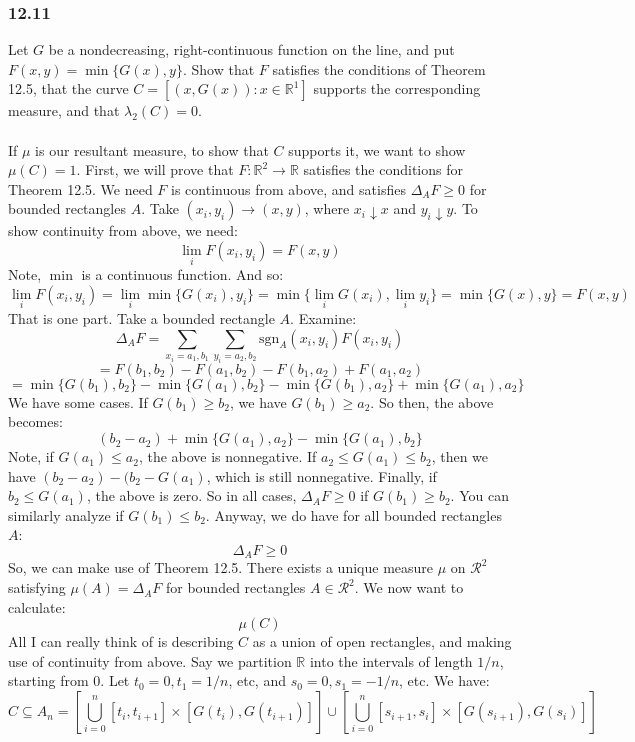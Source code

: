 \documentclass[12pt,a4paper]{article}
\newcommand{\1}[1]{\mathbbm{1}\left\{ #1 \right\}}
\newcommand{\R}{\mathbb{R}}
\newcommand{\rcal}{\mathcal{R}}
\newcommand{\sgn}{\text{sgn}}
\begin{document}
\subsubsection{12.11} Let $G$ be a nondecreasing, right-continuous function on the line, and put $F(x,y) = \min\{G(x),y\}$. Show that $F$ satisfies the conditions of Theorem 12.5, that the curve $C = \left[(x,G(x)) : x \in \R^1\right]$ supports the corresponding measure, and that $\lambda_2(C) = 0$.
\\\\
If $\mu$ is our resultant measure, to show that $C$ supports it, we want to show $\mu(C) = 1$. First, we will prove that $F: \R^2 \to \R$ satisfies the conditions for Theorem 12.5. We need $F$ is continuous from above, and satisfies $\Delta_AF \geq 0$ for bounded rectangles $A$. Take $(x_i,y_i) \to (x,y)$, where $x_i \downarrow x$ and $y_i \downarrow y$. To show continuity from above, we need:
$$
	\lim_i F(x_i,y_i) = F(x,y)
$$
Note, $\min$ is a continuous function. And so:
$$
	\lim_i F(x_i,y_i) = \lim_i \min\{G(x_i),y_i\} =
	\min\{\lim_i G(x_i), \lim_i y_i\} = \min\{G(x),y\} = F(x,y)
$$
That is one part. Take a bounded rectangle $A$. Examine:
$$
	\Delta_AF =
	\sum_{x_i = a_1,b_1} \sum_{y_i = a_2,b_2} \sgn_A(x_i,y_i)F(x_i,y_i)
$$
$$
	= F(b_1,b_2) - F(a_1,b_2) - F(b_1,a_2) + F(a_1,a_2)
$$
$$
	= \min\{G(b_1),b_2\} - \min\{G(a_1),b_2\} - \min\{G(b_1),a_2\} + \min\{G(a_1),a_2\}
$$
We have some cases. If $G(b_1) \geq b_2$, we have $G(b_1) \geq a_2$. So then, the above becomes:
$$
	(b_2 - a_2) + \min\{G(a_1),a_2\} - \min\{G(a_1),b_2\}
$$
Note, if $G(a_1) \leq a_2$, the above is nonnegative. If $a_2 \leq G(a_1) \leq b_2$, then we have $(b_2 - a_2) - (b_2 - G(a_1)$, which is still nonnegative. Finally, if $b_2 \leq G(a_1)$, the above is zero. So in all cases, $\Delta_AF \geq 0$ if $G(b_1) \geq b_2$. You can similarly analyze if $G(b_1) \leq b_2$. Anyway, we do have for all bounded rectangles $A$:
$$
	\Delta_AF \geq 0
$$
So, we can make use of Theorem 12.5. There exists a unique measure $\mu$ on $\rcal^2$ satisfying $\mu(A) = \Delta_AF$ for bounded rectangles $A \in \rcal^2$. We now want to calculate:
$$
	\mu(C)
$$
All I can really think of is describing $C$ as a union of open rectangles, and making use of continuity from above. Say we partition $\R$ into the intervals of length $1/n$, starting from $0$. Let $t_0 = 0, t_1 = 1/n$, etc, and $s_0 = 0, s_1 = -1/n$, etc. We have:
$$
	C \subseteq A_n = \left[\bigcup_{i=0}^n [t_i, t_{i+1}] \times [G(t_i), G(t_{i+1})]\right]
	\cup
	\left[\bigcup_{i=0}^n [s_{i+1}, s_i] \times [G(s_{i+1}), G(s_i)]\right]
$$
\end{document}
